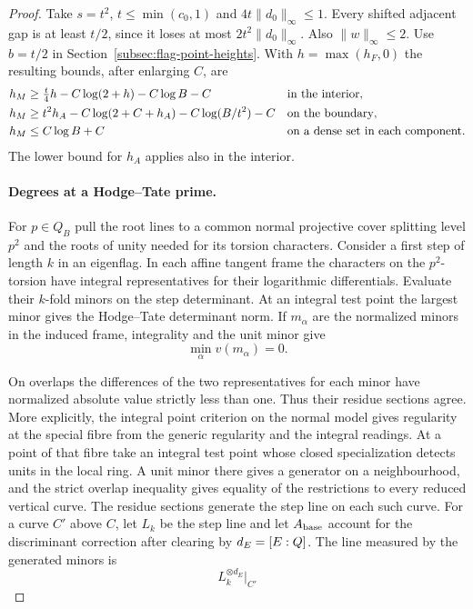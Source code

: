 \begin{proof}
Take \(s=t^2\),
\(t\le\min(c_0,1)\) and \(4t\|d_0\|_\infty\le1\). Every
shifted adjacent gap is at least \(t/2\), since it loses at most
\(2t^2\|d_0\|_\infty\). Also \(\|w\|_\infty\le2\).
Use \(b=t/2\) in Section~\ref{subsec:flag-point-heights}. With
\(h=\max(h_F,0)\) the resulting bounds, after enlarging \(C\), are
\begin{align}
 h_M &\ge \tfrac t4 h-C\log(2+h)-C\log B-C
           &&\text{in the interior},\notag\\
 h_M &\ge t^2 h_A-C\log(2+C+h_A)-C\log(B/t^2)-C
           &&\text{on the boundary},\label{eq:flag-actual-ht}\\
 h_M &\le C\log B+C &&\text{on a dense set in each component}.
           \notag
\end{align}
The lower bound for \(h_A\) applies also in the interior.

\paragraph{Degrees at a Hodge--Tate prime.}
For \(p\in Q_B\) pull the root lines to a common normal projective
cover splitting level \(p^2\) and the roots of unity needed for its
torsion characters. Consider a first step of length \(k\) in an
eigenflag. In each affine tangent frame the characters on the
\(p^2\)-torsion have integral representatives for their logarithmic
differentials. Evaluate their \(k\)-fold minors on the step
determinant. At an integral test point the largest minor gives
the Hodge--Tate determinant norm. If \(m_\alpha\) are the normalized minors in the induced frame, integrality and the unit minor give
\[
 \min_\alpha v(m_\alpha)=0.
\]

On overlaps
the differences of the two representatives for each minor have
normalized absolute value strictly less than one. Thus their
residue sections agree. More explicitly, the integral point
criterion on the normal model gives regularity at the special
fibre from the generic regularity and the integral readings.
At a point of that fibre take an integral test point whose
closed specialization detects units in the local ring. A unit
minor there gives a generator on a neighbourhood, and the strict
overlap inequality gives equality of the restrictions to every
reduced vertical curve. The residue sections generate the step line on each such
curve. For a curve \(C'\) above \(C\), let \(L_k\) be the
step line and let \(A_{\rm base}\) account for the discriminant
correction after clearing by \(d_E=[E:Q]\). The line measured
by the generated minors is
\[
 L_k^{\otimes d_E}|_{C'}
\]


\end{proof}
